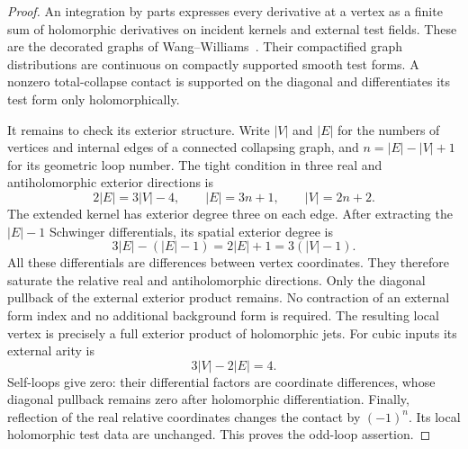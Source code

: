 \begin{proof}
An integration by parts expresses every derivative at a vertex as a
finite sum of holomorphic derivatives on incident kernels and external
test fields.  These are the decorated graphs of
Wang--Williams~\cite[Propositions 3.18, 3.21--3.23]{WW}.  Their
compactified graph distributions are continuous on compactly supported
smooth test forms.  A nonzero total-collapse contact is supported on
the diagonal and differentiates its test form only holomorphically.

It remains to check its exterior structure.  Write $|V|$ and $|E|$ for
the numbers of vertices and internal edges of a connected collapsing
graph, and $n=|E|-|V|+1$ for its geometric loop number.  The tight
condition in three real and antiholomorphic exterior directions is
\begin{equation}
  2|E|=3|V|-4,
  \qquad |E|=3n+1,
  \qquad |V|=2n+2.
  \label{eq:contact-tight-degree}
\end{equation}
The extended kernel has exterior degree three on each edge.
After extracting the $|E|-1$ Schwinger differentials, its spatial
exterior degree is
\begin{equation}
  3|E|-(|E|-1)=2|E|+1=3(|V|-1).
  \label{eq:relative-form-saturation}
\end{equation}
All these differentials are differences between vertex coordinates.
They therefore saturate the relative real and antiholomorphic
directions.  Only the diagonal pullback of the external exterior
product remains.  No contraction of an external form index and no
additional background form is required.  The resulting local vertex
is precisely a full exterior product of holomorphic jets.  For cubic
inputs its external arity is
\begin{equation}
  3|V|-2|E|=4.
\end{equation}
Self-loops give zero: their differential factors are coordinate
differences, whose diagonal pullback remains zero after holomorphic
differentiation.  Finally, reflection of the real relative coordinates
changes the contact by $(-1)^n$.  Its local holomorphic test data are
unchanged.  This proves the odd-loop assertion.
\end{proof}

